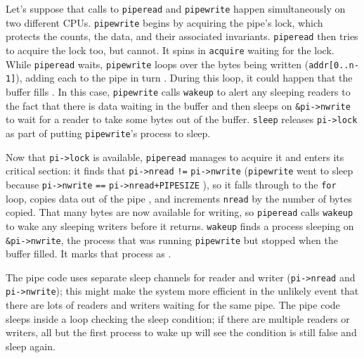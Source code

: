 Let's suppose that calls to
\lstinline{piperead}
and
\lstinline{pipewrite}
happen simultaneously on two different CPUs.
\lstinline{pipewrite}
begins by acquiring the pipe's lock, which
protects the counts, the data, and their
associated invariants.
\lstinline{piperead}
then tries to acquire the lock too, but cannot.
It spins in
\lstinline{acquire}
waiting for the lock.
While
\lstinline{piperead}
waits,
\lstinline{pipewrite}
loops over the bytes being written
(\lstinline{addr[0..n-1]}),
adding each to the pipe in turn
.
During this loop, it could happen that
the buffer fills
.
In this case, 
\lstinline{pipewrite}
calls
\lstinline{wakeup}
to alert any sleeping readers to the fact
that there is data waiting in the buffer
and then sleeps on
\lstinline{&pi->nwrite}
to wait for a reader to take some bytes
out of the buffer.
\lstinline{sleep}
releases 
\lstinline{pi->lock}
as part of putting
\lstinline{pipewrite}'s
process to sleep.

Now that
\lstinline{pi->lock}
is available,
\lstinline{piperead}
manages to acquire it and enters its critical section:
it finds that
\lstinline{pi->nread}
\lstinline{!=}
\lstinline{pi->nwrite}
(\lstinline{pipewrite}
went to sleep because
\lstinline{pi->nwrite}
\lstinline{==}
\lstinline{pi->nread+PIPESIZE}
),
so it falls through to the 
\lstinline{for}
loop, copies data out of the pipe
,
and increments 
\lstinline{nread}
by the number of bytes copied.
That many bytes are now available for writing, so
\lstinline{piperead}
calls
\lstinline{wakeup}
to wake any sleeping writers
before it returns.
\lstinline{wakeup}
finds a process sleeping on
\lstinline{&pi->nwrite},
the process that was running
\lstinline{pipewrite}
but stopped when the buffer filled.
It marks that process as
.

The pipe code uses separate sleep channels for reader and writer
(\lstinline{pi->nread}
and
\lstinline{pi->nwrite});
this might make the system more efficient in the unlikely
event that there are lots of
readers and writers waiting for the same pipe.
The pipe code sleeps inside a loop checking the
sleep condition; if there are multiple readers
or writers, all but the first process to wake up
will see the condition is still false and sleep again.
